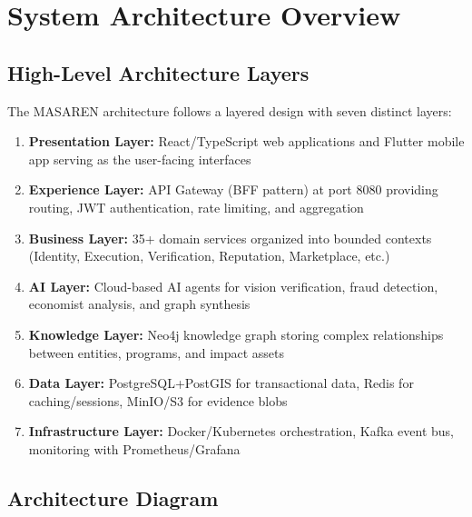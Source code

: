 
\section{System Architecture Overview}

\subsection{High-Level Architecture Layers}

The MASAREN architecture follows a layered design with seven distinct layers:

\begin{enumerate}
  \item \textbf{Presentation Layer:} React/TypeScript web applications and Flutter mobile app serving as the user-facing interfaces
  \item \textbf{Experience Layer:} API Gateway (BFF pattern) at port 8080 providing routing, JWT authentication, rate limiting, and aggregation
  \item \textbf{Business Layer:} 35+ domain services organized into bounded contexts (Identity, Execution, Verification, Reputation, Marketplace, etc.)
  \item \textbf{AI Layer:} Cloud-based AI agents for vision verification, fraud detection, economist analysis, and graph synthesis
  \item \textbf{Knowledge Layer:} Neo4j knowledge graph storing complex relationships between entities, programs, and impact assets
  \item \textbf{Data Layer:} PostgreSQL+PostGIS for transactional data, Redis for caching/sessions, MinIO/S3 for evidence blobs
  \item \textbf{Infrastructure Layer:} Docker/Kubernetes orchestration, Kafka event bus, monitoring with Prometheus/Grafana
\end{enumerate}

\subsection{Architecture Diagram}

